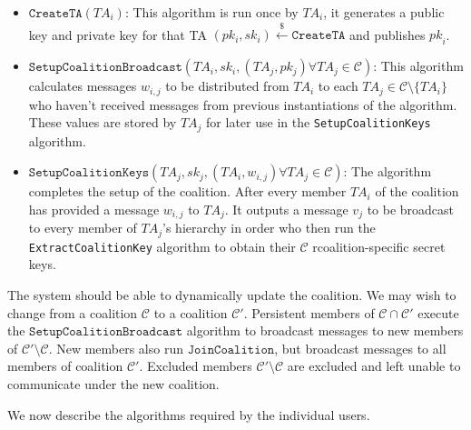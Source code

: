 \documentclass[10pt]{llncs}
\newcommand{\C}{\mathcal{C}}
\newcommand{\TA}{\mathit{TA}}
\newcommand{\pk}{\mathit{pk}}
\newcommand{\getsr}{\stackrel{{\scriptscriptstyle\$}}{\gets}}
\begin{document}
\begin{itemize}

\item $\texttt{CreateTA}(\TA_i)$: This algorithm is run once by $\TA_i$, it generates a public key and private key for that TA $(pk_i,sk_i)\getsr \texttt{CreateTA}$ and publishes $\pk_i$.
\medskip

\item $\texttt{SetupCoalitionBroadcast}(\TA_i,sk_{i},(\TA_j,pk_j) \forall \TA_j \in \C)$: This algorithm calculates messages $w_{i,j}$ to be distributed from $\TA_i$ to each $\TA_j \in \C \setminus \{\TA_i\}$ who haven't received messages from previous instantiations of the algorithm. These values are stored by $\TA_j$ for later use in the \texttt{SetupCoalitionKeys} algorithm.
\medskip

\item $\texttt{SetupCoalitionKeys}(\TA_j,sk_j,(\TA_i,w_{i,j}) \forall \TA_j \in \C)$: The algorithm completes the setup of the coalition. After every member $\TA_{i}$ of the coalition has provided a message $w_{i,j}$ to $\TA_j$. It outputs a message $v_j$ to be broadcast to every member of $\TA_j$'s hierarchy in order who then run the \texttt{ExtractCoalitionKey} algorithm to obtain their $\C$ rcoalition-specific secret keys.


\end{itemize}

The system should be able to dynamically update the coalition. We may wish to change from a coalition $\C$ to a coalition $\C'$. Persistent members of $\C \cap \C'$ execute the $\texttt{SetupCoalitionBroadcast}$ algorithm to broadcast messages to new members of $\C' \setminus \C$. New members also run $\texttt{JoinCoalition}$, but broadcast messages to all members of coalition $\C'$. Excluded members $\C'\setminus \C$ are excluded and left unable to communicate under the new coalition.

We now describe the algorithms required by the individual users.
\end{document}
